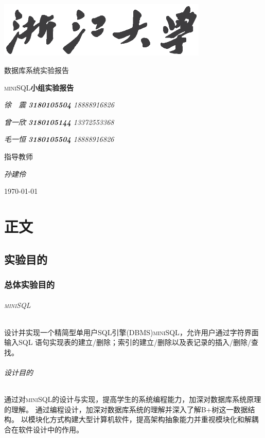 \documentclass[UTF8]{ctexrep} %
\begin{document}
\begin{titlepage}
	\centering
	\includegraphics[width=0.75\textwidth]{figure/浙江大学.eps}\par\vspace{1cm}
	{\scshape\LARGE 数据库系统实验报告\par}
	\vspace{1.5cm}
	{\huge\textsc{\textsc{miniSQL}}\textbf{小组实验报告}\par}
	\vspace{2cm}
	{\Large\itshape 徐\ \ 震 \textbf{3180105504} 18888916826\par}
	{\Large\itshape 曾一欣 \textbf{3180105144} 13372553368\par}
	{\Large\itshape 毛一恒 \textbf{3180105504} 18888916826\par}
	\vfill
	指导教师\par
	\textit{孙建伶}

	\vfill

	{\large \today\par}
\end{titlepage}


\newpage
\tableofcontents
\newpage
\part{正文}
\chapter{实验目的}
\section{总体实验目的}
\paragraph{\textsc{miniSQL}}
设计并实现一个精简型单用户SQL引擎(DBMS)\textsc{miniSQL}，允许用户通过字符界面输入SQL 语句实现表的建立/删除；索引的建立/删除以及表记录的插入/删除/查找。

\paragraph{设计目的}
通过对\textsc{miniSQL}的设计与实现，提高学生的系统编程能力，加深对数据库系统原理的理解。
通过编程设计，加深对数据库系统的理解并深入了解B+树这一数据结构。
以模块化方式构建大型计算机软件，提高架构抽象能力并重视模块化和解耦合在软件设计中的作用。
\end{document}
